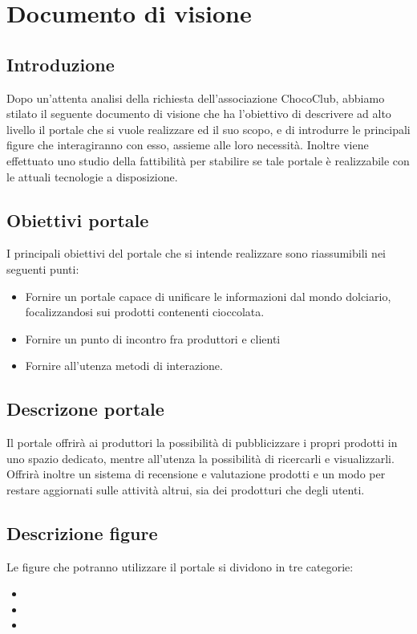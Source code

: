 \chapter{Documento di visione} 
\label{cha:documento_di_visione}

\section{Introduzione}
\label{sec:introduzione}
Dopo un'attenta analisi della richiesta dell'associazione ChocoClub, abbiamo stilato il seguente documento di visione che ha l'obiettivo di descrivere ad alto livello il portale che si vuole realizzare ed il suo scopo, e di introdurre le principali figure che interagiranno con esso, assieme alle loro necessità. Inoltre viene effettuato uno studio della fattibilità per stabilire se tale portale è realizzabile con le attuali tecnologie a disposizione.

\section{Obiettivi portale} 
\label{sec:descrizione_portale}
I principali obiettivi del portale che si intende realizzare sono riassumibili nei seguenti punti:
\begin{itemize}
	\item Fornire un portale capace di unificare le informazioni dal mondo dolciario, focalizzandosi sui prodotti contenenti cioccolata.
	\item Fornire un punto di incontro fra produttori e clienti
	\item Fornire all'utenza metodi di interazione.
\end{itemize}

\section{Descrizone portale}
\label{sec:descrizone_portale}
Il portale offrirà ai produttori la possibilità di pubblicizzare i propri prodotti in uno spazio dedicato, mentre all'utenza la possibilità di ricercarli e visualizzarli. Offrirà inoltre un sistema di recensione e valutazione prodotti e un modo per restare aggiornati sulle attività altrui, sia dei prodotturi che degli utenti.

\section{Descrizione figure} 
\label{sec:descrizionefigure}
Le figure che potranno utilizzare il portale si dividono in tre categorie:
\begin{itemize}
	\item {}
	\item {}
	\item {}
\end{itemize}

